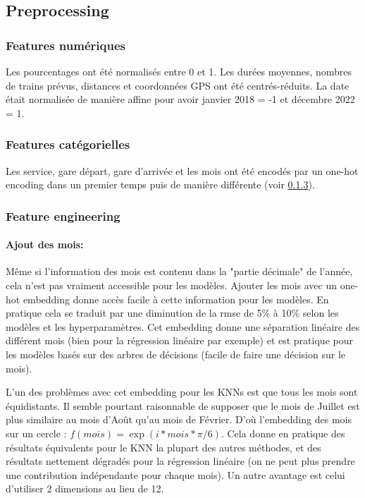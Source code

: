 \documentclass{article}
\begin{document}
\subsection{Preprocessing}


\subsubsection{Features numériques}

Les pourcentages ont été normalisés entre 0 et 1. Les durées moyennes, nombres de trains prévus, distances et coordonnées GPS ont été centrés-réduits. La date était normalisée de manière affine pour avoir janvier 2018 = -1 et décembre 2022 = 1.

\subsubsection{Features catégorielles}

Les service, gare départ, gare d'arrivée et les mois ont été encodés par un one-hot encoding dans un premier temps puis de manière différente (voir \ref{sec:feat_eng}).

\subsubsection{Feature engineering}
\label{sec:feat_eng}

\paragraph{Ajout des mois:}

Même si l'information des mois est contenu dans la "partie décimale" de l'année, cela n'est pas vraiment accessible pour les modèles. Ajouter les mois avec un one-hot embedding donne accès facile à cette information pour les modèles. En pratique cela se traduit par une diminution de la rmse de 5\% à 10\% selon les modèles et les hyperparamètres. Cet embedding donne une séparation linéaire des différent mois (bien pour la régression linéaire par exemple) et est pratique pour les modèles basés sur des arbres de décisions (facile de faire une décision sur le mois).

L'un des problèmes avec cet embedding pour les KNNs est que tous les mois sont équidistants. Il semble pourtant raisonnable de supposer que le mois de Juillet est plus similaire au mois d'Août qu'au mois de Février. D'où l'embedding des mois sur un cercle : $f(mois) = \exp (i * mois * \pi / 6)$. Cela donne en pratique des résultats équivalents pour le KNN la plupart des autres méthodes, et des résultats nettement dégradés pour la régression linéaire (on ne peut plus prendre une contribution indépendante pour chaque mois). Un autre avantage est celui d'utiliser 2 dimensions au lieu de 12.
\end{document}
